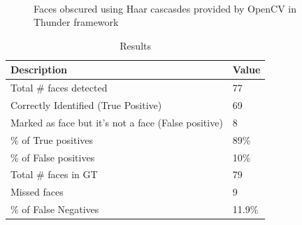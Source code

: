 \documentclass[
	submission,
	final,
	notitlepage,
	narroweqnarray,
	inline,
	twoside,
	]{ieee}
\begin{document}
\begin{figure}[h]
{	}\\
	\caption{Faces obscured using Haar cascasdes provided by OpenCV in Thunder framework}
\end{figure}
\FloatBarrier

\begin{table}[h!]
	\caption{Results}
	\label{tab:results}
	\begin{tabular}{|p{6cm} | p{2cm}|}
		\hline
		{\bf Description} & {\bf Value}\\
		\hline
		\hline
		Total \# faces detected & 77\\
		Correctly Identified (True Positive) & 69 \\
		Marked as face but it's not a face (False positive) & 8 \\
		\% of True positives & 89\%\\
		\% of False positives & 10\%\\
		\hline
		Total \# faces in GT & 79\\
		Missed faces & 9\\
		\% of False Negatives & 11.9\%\\
		\hline
	\end{tabular}
\end{table}
\end{document}

